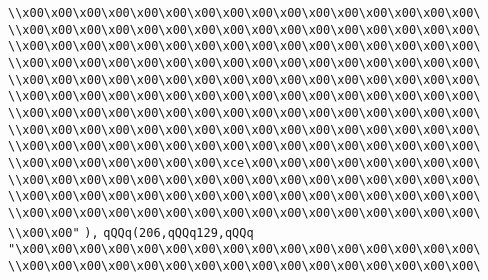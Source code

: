 \verb|\\x00\x00\x00\x00\x00\x00\x00\x00\x00\x00\x00\x00\x00\x00\x00\x00\|\newline
\verb|\\x00\x00\x00\x00\x00\x00\x00\x00\x00\x00\x00\x00\x00\x00\x00\x00\|\newline
\verb|\\x00\x00\x00\x00\x00\x00\x00\x00\x00\x00\x00\x00\x00\x00\x00\x00\|\newline
\verb|\\x00\x00\x00\x00\x00\x00\x00\x00\x00\x00\x00\x00\x00\x00\x00\x00\|\newline
\verb|\\x00\x00\x00\x00\x00\x00\x00\x00\x00\x00\x00\x00\x00\x00\x00\x00\|\newline
\verb|\\x00\x00\x00\x00\x00\x00\x00\x00\x00\x00\x00\x00\x00\x00\x00\x00\|\newline
\verb|\\x00\x00\x00\x00\x00\x00\x00\x00\x00\x00\x00\x00\x00\x00\x00\x00\|\newline
\verb|\\x00\x00\x00\x00\x00\x00\x00\x00\x00\x00\x00\x00\x00\x00\x00\x00\|\newline
\verb|\\x00\x00\x00\x00\x00\x00\x00\x00\x00\x00\x00\x00\x00\x00\x00\x00\|\newline
\verb|\\x00\x00\x00\x00\x00\x00\x00\xce\x00\x00\x00\x00\x00\x00\x00\x00\|\newline
\verb|\\x00\x00\x00\x00\x00\x00\x00\x00\x00\x00\x00\x00\x00\x00\x00\x00\|\newline
\verb|\\x00\x00\x00\x00\x00\x00\x00\x00\x00\x00\x00\x00\x00\x00\x00\x00\|\newline
\verb|\\x00\x00\x00\x00\x00\x00\x00\x00\x00\x00\x00\x00\x00\x00\x00\x00\|\newline
\verb|\\x00\x00"|\newline
\verb|),|\newline
\verb|qQQq(206,qQQq129,qQQq|\newline
\verb|"\x00\x00\x00\x00\x00\x00\x00\x00\x00\x00\x00\x00\x00\x00\x00\x00\|\newline
\verb|\\x00\x00\x00\x00\x00\x00\x00\x00\x00\x00\x00\x00\x00\x00\x00\x00\|\newline
